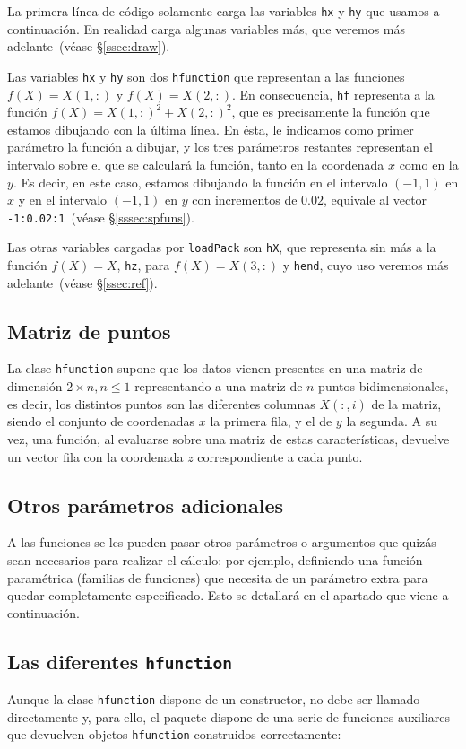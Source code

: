 \documentclass{article}
\newcommand{\refpar}[1]{\S\ref{#1}}
\newcommand{\refsec}[1]{(véase \refpar{#1})}
\begin{document}
La primera línea de código solamente carga las variables \texttt{hx} y
\texttt{hy} que usamos a continuación. En realidad carga algunas
variables más, que veremos más adelante~\refsec{ssec:draw}.

Las variables \texttt{hx} y \texttt{hy} son dos
\texttt{hfunction} que representan a las funciones $f(X) = X(1, :)$ y
$f(X) = X(2, :)$. En consecuencia, \texttt{hf} representa a la función
$f(X) = X(1, :) ^ 2 + X(2, :) ^ 2$, que es precisamente la función que
estamos dibujando con la última línea. En ésta, le indicamos como
primer parámetro la función a dibujar, y los tres parámetros restantes
representan el intervalo sobre el que se calculará la función, tanto
en la coordenada $x$ como en la $y$. Es decir, en este caso, estamos
dibujando la función en el intervalo $(-1, 1)$ en $x$ y en el
intervalo $(-1, 1)$ en $y$ con incrementos de $0.02$, equivale al
vector \texttt{-1:0.02:1}~\refsec{sssec:spfuns}.

Las otras variables cargadas por \texttt{loadPack} son \texttt{hX},
que representa sin más a la función $f(X) = X$, \texttt{hz}, para
$f(X) = X(3, :)$ y \texttt{hend}, cuyo uso veremos más
adelante~\refsec{ssec:ref}.

\subsection{Matriz de puntos}
\label{ssec:matrix}
La clase \texttt{hfunction} supone que los datos vienen presentes en
una matriz de dimensión $2\times n, n\leq 1$ representando a una
matriz de $n$ puntos bidimensionales, es decir, los distintos puntos
son las diferentes columnas $X(:, i)$ de la matriz, siendo el conjunto
de coordenadas $x$ la primera fila, y el de $y$ la segunda. A su
vez, una función, al evaluarse sobre una matriz de estas
características, devuelve un vector fila con la coordenada $z$
correspondiente a cada punto.

\subsection{Otros parámetros adicionales}
\label{ssec:params}
A las funciones se les pueden pasar otros parámetros o argumentos que quizás
sean necesarios para realizar el cálculo: por ejemplo, definiendo una
función paramétrica (familias de funciones) que necesita de un
parámetro extra para quedar completamente especificado. Esto se detallará
en el apartado que viene a continuación.

\subsection{Las diferentes \texttt{hfunction}}
\label{ssec:constr}
Aunque la clase \texttt{hfunction} dispone de un constructor, no debe
ser llamado directamente y, para ello, el paquete dispone de una serie
de funciones auxiliares que devuelven objetos \texttt{hfunction}
construidos correctamente:
\end{document}
